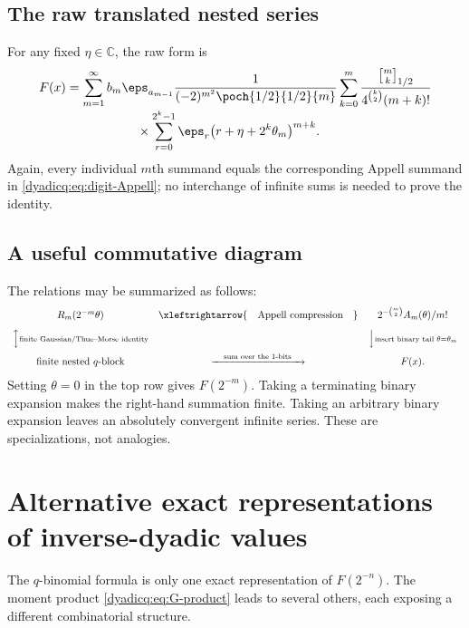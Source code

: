 \documentclass[11pt,oneside]{article}
\theoremstyle{definition}
\theoremstyle{remark}
\newcommand{\C}{\mathbb C}
\newcommand{\qbinom}[3]{\genfrac{[}{]}{0pt}{}{#1}{#2}_{#3}}
\begin{document}
\subsection{The raw translated nested series}

For any fixed $\eta\in\C$, the raw form is
\begin{align}\label{dyadicq:eq:raw-digit-q}
 F(x)
 &=\sum_{m=1}^{\infty}
 b_m\eps_{a_{m-1}}
 \frac1{(-2)^{m^2}\poch{1/2}{1/2}{m}}
 \sum_{k=0}^{m}
 \frac{\qbinom{m}{k}{1/2}}
 {4^{\binom k2}(m+k)!}
 \notag\\[-0.25em]
 &\hspace{5.6em}\times
 \sum_{r=0}^{2^k-1}
 \eps_r\bigl(r+\eta+2^k\theta_m\bigr)^{m+k}.
\end{align}
Again, every individual $m$th summand equals the corresponding Appell summand
in \eqref{dyadicq:eq:digit-Appell}; no interchange of infinite sums is needed to prove
the identity.

\subsection{A useful commutative diagram}

The relations may be summarized as follows:
\[
\begin{array}{ccc}
 R_m(2^{-m}\theta)
 &\xleftrightarrow{\quad\text{Appell compression}\quad}&
 2^{-\binom m2}A_m(\theta)/m!
 \\[0.8em]
 \Big\updownarrow\scriptstyle\text{finite Gaussian/Thue--Morse identity}
 &&
 \Big\downarrow\scriptstyle\text{insert binary tail }\theta=\theta_m
 \\[0.8em]
 \text{finite nested }q\text{-block}
 &\xrightarrow{\quad\text{sum over the 1-bits}\quad}&
 F(x).
\end{array}
\]
Setting $\theta=0$ in the top row gives $F(2^{-m})$.  Taking a terminating
binary expansion makes the right-hand summation finite.  Taking an arbitrary
binary expansion leaves an absolutely convergent infinite series.  These are
specializations, not analogies.

\section{Alternative exact representations of inverse-dyadic values}

The $q$-binomial formula is only one exact representation of
$F(2^{-n})$.  The moment product \eqref{dyadicq:eq:G-product} leads to several others,
each exposing a different combinatorial structure.
\end{document}
